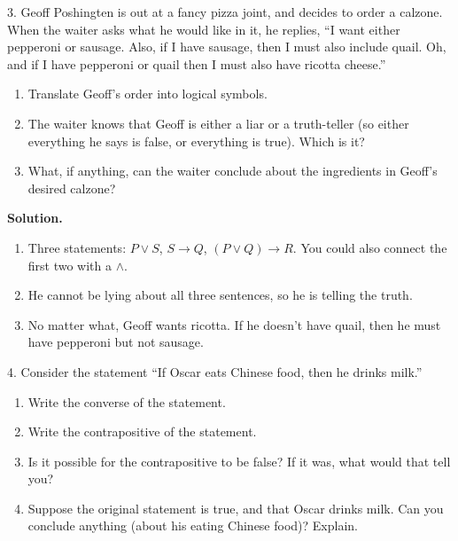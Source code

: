 \documentclass[10pt,]{book}
\theoremstyle{plain}
\theoremstyle{definition}
\theoremstyle{definition}
\theoremstyle{definition}
\def\imp{\rightarrow}
\begin{document}
\begin{exerciselist}
\begin{enumerate}[label=(\alph*)]
\end{enumerate}
\item[3.]\hypertarget{exercise-3}{}
    Geoff Poshingten is out at a fancy pizza joint, and decides to order a calzone. When the waiter asks what he would like in it, he replies, ``I want either pepperoni or sausage. Also, if I have sausage, then I must also include quail. Oh, and if I have pepperoni or quail then I must also have ricotta cheese.''
\leavevmode%
\begin{enumerate}[label=(\alph*)]
\item\hypertarget{li-87}{} Translate Geoff's order into logical symbols. %
\item\hypertarget{li-88}{} The waiter knows that Geoff is either a liar or a truth-teller (so either everything he says is false, or everything is true).  Which is it? %
\item\hypertarget{li-89}{} What, if anything, can the waiter conclude about the ingredients in Geoff's desired calzone? %
\end{enumerate}
\par\smallskip
\par\smallskip
\noindent\textbf{Solution.}\hypertarget{solution-9}{}\quad
\leavevmode%
\begin{enumerate}[label=(\alph*)]
\item\hypertarget{li-90}{} Three statements: \(P \vee S\), \(S \imp Q\), \((P \vee Q) \imp R\).  You could also connect the first two with a \(\wedge\). %
\item\hypertarget{li-91}{} He cannot be lying about all three sentences, so he is telling the truth. %
\item\hypertarget{li-92}{} No matter what, Geoff wants ricotta.  If he doesn't have quail, then he must have pepperoni but not sausage. %
\end{enumerate}
\item[4.]\hypertarget{exercise-4}{} Consider the statement ``If Oscar eats Chinese food, then he drinks milk.'' %
\leavevmode%
\begin{enumerate}[label=(\alph*)]
\item\hypertarget{li-93}{} Write the converse of the statement. %
\item\hypertarget{li-94}{} Write the contrapositive of the statement. %
\item\hypertarget{li-95}{} Is it possible for the contrapositive to be false? If it was, what would that tell you? %
\item\hypertarget{li-96}{} Suppose the original statement is true, and that Oscar drinks milk. Can you conclude anything (about his eating Chinese food)? Explain. %

\end{enumerate}
\end{exerciselist}
\end{document}
